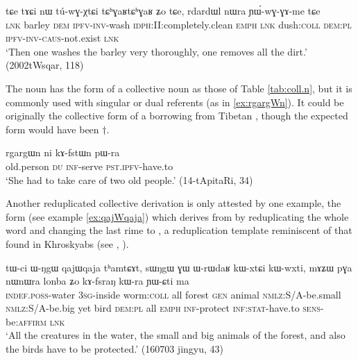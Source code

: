 \begin{exe}
\ex \label{ex:rdardWl}
\gll tɕe tɤɕi nɯ tú-wɣ-χtɕi tɕʰɣaʁtɕʰɣaʁ ʑo tɕe, rdardɯl nɯra ɲɯ́-wɣ-ɣɤ-me tɕe \\
\textsc{lnk} barley \textsc{dem} \textsc{ipfv}-\textsc{inv}-wash \textsc{idph}:II:completely.clean \textsc{emph} \textsc{lnk} dush:\textsc{coll} \textsc{dem:pl} \textsc{ipfv}-\textsc{inv}-\textsc{caus}-not.exist \textsc{lnk} \\
\glt `Then one washes the barley very thoroughly, one removes all the dirt.' (2002tWsqar, 118)
\end{exe}
 
The noun  has the form of a collective noun as those of Table \ref{tab:coll.n}, but it is commonly used with singular or dual referents (as in \ref{ex:rgargWn}). It could be originally the collective form of a borrowing from Tibetan , though the expected form would have been $\dagger$. 
 
\begin{exe}
\ex \label{ex:rgargWn}
\gll  rgargɯn ni kɤ-fstɯn pɯ-ra \\
old.person \textsc{du} \textsc{inf}-serve \textsc{pst.ipfv}-have.to \\
\glt `She had to take care of two old people.' (14-tApitaRi, 34)
\end{exe}

Another reduplicated collective derivation is only attested by one example, the form  (see example \ref{ex:qajWqaja}) which derives from   by reduplicating the  whole word and changing the last rime to , a reduplication template reminiscent of that found in Khroskyabs (see \citealt{lai13fuyin}, \citealt[22-24]{lai17khroskyabs}).

\begin{exe}
\ex \label{ex:qajWqaja}
\gll
tɯ-ci ɯ-ŋgɯ qajɯqaja tʰamtɕɤt, sɯŋgɯ ɣɯ ɯ-rɯdaʁ kɯ-xtɕi kɯ-wxti, mɤʑɯ pɣa nɯnɯra lonba ʑo kɤ-fsraŋ kɯ-ra ɲɯ-ɕti ma \\
\textsc{indef.poss}-water \textsc{3sg}-inside worm:\textsc{coll} all forest \textsc{gen} animal \textsc{nmlz}:S/A-be.small \textsc{nmlz}:S/A-be.big yet bird \textsc{dem:pl} all \textsc{emph} \textsc{inf}-protect \textsc{inf:stat}-have.to \textsc{sens}-be:\textsc{affirm} \textsc{lnk} \\
\glt `All the creatures in the water, the small and big animals of the forest, and also the birds have to be protected.' (160703 jingyu, 43)
\end{exe}


